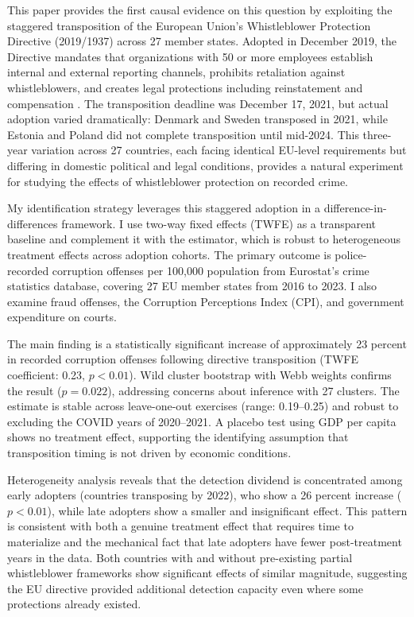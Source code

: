 \documentclass[12pt]{article}
\begin{document}
This paper provides the first causal evidence on this question by exploiting the staggered transposition of the European Union's Whistleblower Protection Directive (2019/1937) across 27 member states. Adopted in December 2019, the Directive mandates that organizations with 50 or more employees establish internal and external reporting channels, prohibits retaliation against whistleblowers, and creates legal protections including reinstatement and compensation \citep{eu_directive_2019}. The transposition deadline was December 17, 2021, but actual adoption varied dramatically: Denmark and Sweden transposed in 2021, while Estonia and Poland did not complete transposition until mid-2024. This three-year variation across 27 countries, each facing identical EU-level requirements but differing in domestic political and legal conditions, provides a natural experiment for studying the effects of whistleblower protection on recorded crime.

My identification strategy leverages this staggered adoption in a difference-in-differences framework. I use two-way fixed effects (TWFE) as a transparent baseline and complement it with the \citet{callaway_santanna_2021} estimator, which is robust to heterogeneous treatment effects across adoption cohorts. The primary outcome is police-recorded corruption offenses per 100,000 population from Eurostat's crime statistics database, covering 27 EU member states from 2016 to 2023. I also examine fraud offenses, the Corruption Perceptions Index (CPI), and government expenditure on courts.

The main finding is a statistically significant increase of approximately 23 percent in recorded corruption offenses following directive transposition (TWFE coefficient: 0.23, $p < 0.01$). Wild cluster bootstrap with Webb weights confirms the result ($p = 0.022$), addressing concerns about inference with 27 clusters. The estimate is stable across leave-one-out exercises (range: 0.19--0.25) and robust to excluding the COVID years of 2020--2021. A placebo test using GDP per capita shows no treatment effect, supporting the identifying assumption that transposition timing is not driven by economic conditions.

Heterogeneity analysis reveals that the detection dividend is concentrated among early adopters (countries transposing by 2022), who show a 26 percent increase ($p < 0.01$), while late adopters show a smaller and insignificant effect. This pattern is consistent with both a genuine treatment effect that requires time to materialize and the mechanical fact that late adopters have fewer post-treatment years in the data. Both countries with and without pre-existing partial whistleblower frameworks show significant effects of similar magnitude, suggesting the EU directive provided additional detection capacity even where some protections already existed.
\end{document}

